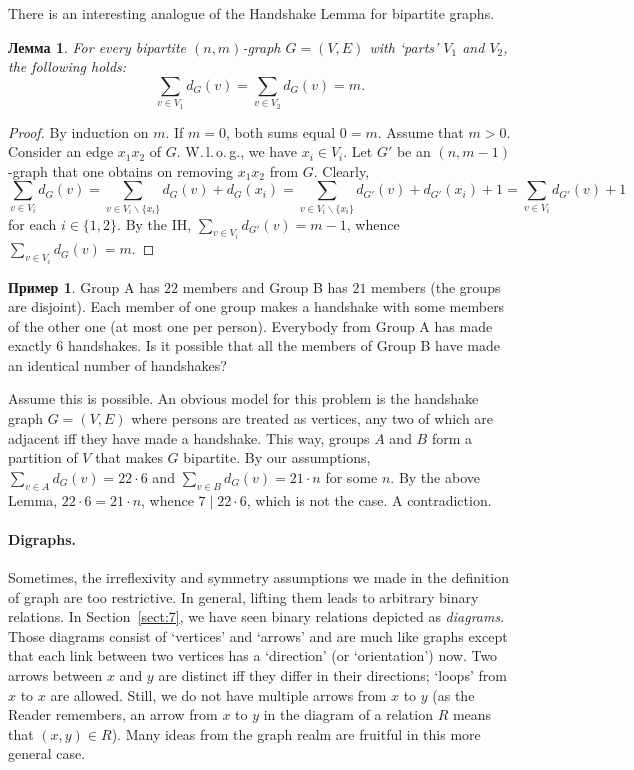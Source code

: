 \documentclass[12pt,notitlepage]{article}
\theoremstyle{plain}
\newtheorem{lemma}[thm]{Лемма}
\theoremstyle{definition}
\newtheorem{exm}[thm]{Пример}
\theoremstyle{plain}
\renewcommand{\setminus}{\smallsetminus}
\newcommand{\1}{\mathbf{1}}
\newcommand{\0}{\mathbf{0}}
\newcommand{\dvd}{\mathop{\mid}}
\begin{document}
There is an interesting analogue of the Handshake Lemma for bipartite graphs.
\begin{lemma}
	For every bipartite $(n, m)$-graph $G = (V, E)$ with `parts' $V_1$ and $V_2$, the following holds:
	$$\sum_{v \in V_1} d_G(v) = \sum_{v \in V_2} d_G(v) = m.$$
\end{lemma}
\begin{proof}
	By induction on $m$. If $m = 0$, both sums equal $0 = m$. Assume that $m > 0$. Consider an edge $x_1 x_2$ of $G$.  W.\,l.\,o.\,g., we have $x_i \in V_i$. Let $G'$ be an $(n,m - 1)$-graph that one obtains on removing $x_1 x_2$ from $G$. Clearly, $$\sum_{v \in V_i} d_G(v) = \sum_{v \in V_i \setminus \{ x_i \} } d_G(v) + d_G(x_i) = \sum_{v \in V_i \setminus \{ x_i \} } d_{G'}(v) + d_{G'}(x_i) + 1 = \sum_{v \in V_i} d_{G'}(v) + 1$$
	for each $i \in \{1, 2\}$. By the IH, $\sum_{v \in V_i} d_{G'}(v) = m - 1$, whence $\sum_{v \in V_i} d_G(v) = m$.
\end{proof}

\begin{exm}
	Group A has $22$ members and Group B has $21$ members (the groups are disjoint). Each member of one group makes a handshake with some members of the other one (at most one per person). Everybody from Group A has made exactly $6$ handshakes. Is it possible that all the members of Group B have made an identical number of handshakes?
	
	Assume this is possible. An obvious model for this problem is the handshake graph $G = (V, E)$ where persons are treated as vertices, any two of which are adjacent iff they have made a handshake. This way, groups $A$ and $B$ form a partition of $V$ that makes $G$ bipartite. By our assumptions, $\sum_{v \in A} d_{G}(v) = 22\cdot 6$ and $\sum_{v \in B} d_{G}(v) = 21\cdot n$ for some $n$. By the above Lemma, $22 \cdot 6 = 21 \cdot n$, whence $7 \dvd 22 \cdot 6$, which is not the case. A contradiction.
\end{exm}

\paragraph{Digraphs.} Sometimes, the irreflexivity and symmetry assumptions we made in the definition of graph are too restrictive. In general, lifting them leads to arbitrary binary relations. In Section~\ref{sect:7}, we have seen binary relations depicted as \emph{diagrams}. Those diagrams consist of `vertices' and `arrows' and are much like graphs except that each link between two vertices has a `direction' (or `orientation') now. Two arrows between $x$ and $y$ are distinct iff they differ in their directions; `loops' from $x$ to $x$ are allowed. Still, we do not have multiple arrows from $x$ to $y$ (as the Reader remembers, an arrow from $x$ to $y$ in the diagram of a relation $R$ means that $(x,y) \in R$). Many ideas from the graph realm are fruitful in this more general case.
\end{document}
